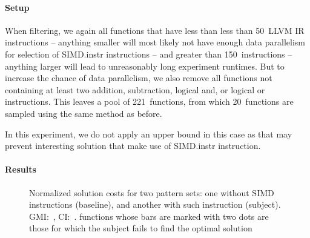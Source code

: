 \paragraph{Setup}

When filtering, we again all \glspl{function} that have less than less than
\num{50}~\gls{LLVM} \gls{IR} \glspl{instruction} -- anything smaller will most
likely not have enough data parallelism for selection of \gls{SIMD.instr}
\glspl{instruction} -- and greater than \num{150}~\glspl{instruction} --
anything larger will lead to unreasonably long experiment runtimes.
%
But to increase the chance of data parallelism, we also remove all
\glspl{function} not containing at least two addition, subtraction, logical and,
or logical or \glspl{instruction}.
%
This leaves a pool of \num{221}~\glspl{function}, from which
\num{20}~\glspl{function} are sampled using the same method as before.

In this experiment, we do not apply an upper bound in this case as that may
prevent interesting \gls{solution} that make use of \gls{SIMD.instr}
\gls{instruction}.



\paragraph{Results}



\begin{figure}
  \centering%
  \maxsizebox{\textwidth}{!}{%
    \trimBarchartPlot{%
    }%
  }

  \caption[Plot for evaluating the impact of SIMD instructions on code quality]%
          {%
            Normalized solution costs for two pattern sets: one without SIMD
            instructions (baseline), and another with such instruction
            (subject).
            GMI:~\printGMI{%
              \SimdVsWithoutCyclesSpeedupCyclesRegularSpeedupGmean%
            },
            CI:~\printGMICI{%
              \SimdVsWithoutCyclesSpeedupCyclesRegularSpeedupCiMin%
            }{%
              \SimdVsWithoutCyclesSpeedupCyclesRegularSpeedupCiMax%
            }.
            \Glspl{function} whose bars are marked with two dots are those
            for which the \gls{subject} fails to find the optimal solution%
          }
\end{figure}

